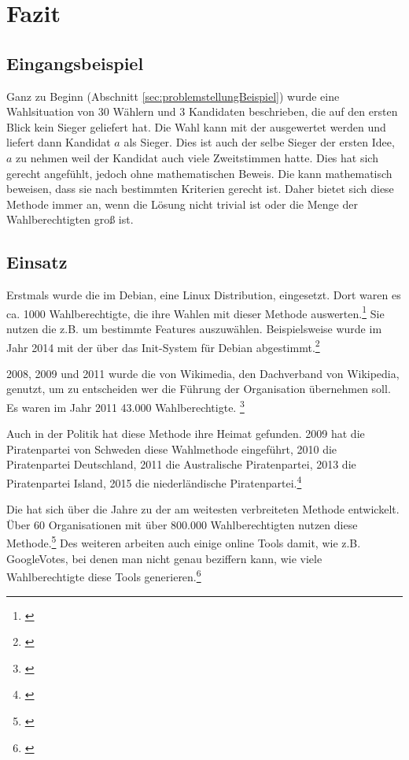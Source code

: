 \newpage
\section{Fazit}
\label{sec:Fazit}

\subsection{Eingangsbeispiel}
Ganz zu Beginn (Abschnitt \ref{sec:problemstellungBeispiel}) wurde eine Wahlsituation von 30 Wählern und 3 Kandidaten beschrieben, die auf den ersten Blick kein Sieger geliefert hat. Die Wahl kann mit der \schulze ausgewertet werden und liefert dann Kandidat $a$ als Sieger. Dies ist auch der selbe Sieger der ersten Idee, $a$ zu nehmen weil der Kandidat auch viele Zweitstimmen hatte. Dies hat sich gerecht angefühlt, jedoch ohne mathematischen Beweis. Die \schulze kann mathematisch beweisen, dass sie nach bestimmten Kriterien gerecht ist. Daher bietet sich diese Methode immer an, wenn die Lösung nicht trivial ist oder die Menge der Wahlberechtigten groß ist. 

\subsection{Einsatz} 
\label{sec:einsatz}
Erstmals wurde die  im Debian, eine Linux Distribution, eingesetzt. Dort waren es ca. 1000 Wahlberechtigte, die ihre Wahlen mit dieser Methode auswerten.\footnote{\Vgl \citet{Debian2018}} Sie nutzen die \schulze z.B. um bestimmte Features auszuwählen. Beispielsweise wurde im Jahr 2014 mit der \schulze über das Init-System für Debian abgestimmt.\footnote{\Vgl \citet{Leemhu2014}}



2008, 2009 und 2011 wurde die \schulze von Wikimedia, den Dachverband von Wikipedia, genutzt, um zu entscheiden wer die Führung der Organisation übernehmen soll. Es waren im Jahr 2011 43.000 Wahlberechtigte. \footnote{\Vgl \citet{Schulze2017}}

Auch in der Politik hat diese Methode ihre Heimat gefunden. 2009 hat die Piratenpartei von Schweden diese Wahlmethode eingeführt, 2010 die Piratenpartei Deutschland, 2011 die Australische Piratenpartei, 2013 die Piratenpartei Island, 2015 die niederländische Piratenpartei.\footnote{\Vgl \citet{Lohmann2013}}

Die \schulze hat sich über die Jahre zu der am weitesten verbreiteten \condorcet Methode entwickelt. Über 60 Organisationen mit über 800.000 Wahlberechtigten nutzen diese Methode.\footnote{\Vgl \citet{Schulze2018}} Des weiteren arbeiten auch einige online Tools damit, wie z.B. GoogleVotes, bei denen man nicht genau beziffern kann, wie viele Wahlberechtigte diese Tools generieren.\footnote{\Vgl \citet{Hardt2015}}








